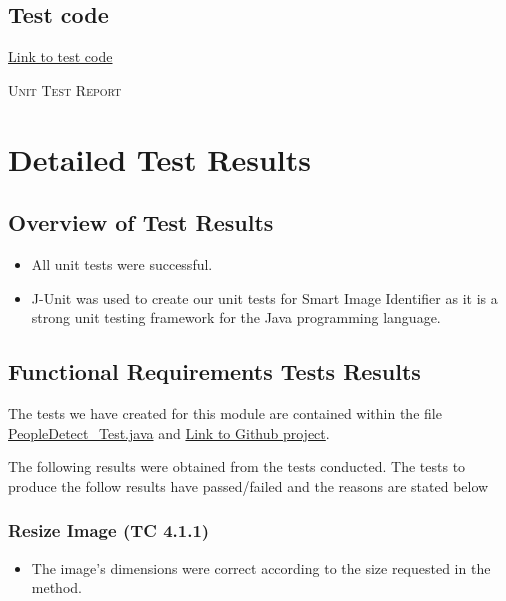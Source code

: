 \documentclass[a4paper,12pt]{report}
\begin{document}
	\subsection {Test code}
		\href{https://github.com/StephenSwanepoel/Ambitious-Designs/blob/master/Smart\%20Image\%20Identifier/src/test/com/codeferm/opencv/PeopleDetect\_Test.java}{Link to test code}  
	
\newpage
\begin{center}
	\textsc{\LARGE Unit Test Report}\\[1.5cm]
\end{center}
	\section{Detailed Test Results}
	\label{sec:Results}
	\subsection{Overview of Test Results}
	\begin {itemize}
	\item All unit tests were successful.
	\item J-Unit was used to create our unit tests for Smart Image Identifier as it is a strong unit testing framework for the Java programming language.
	\end {itemize}

	\subsection{Functional Requirements Tests Results}
		The tests we have created for this module are contained within the file \href{https://github.com/StephenSwanepoel/Ambitious-Designs/blob/master/Smart\%20Image\%20Identifier/src/test/com/codeferm/opencv/PeopleDetect\_Test.java}{PeopleDetect\_Test.java} and \href{https://github.com/StephenSwanepoel/Ambitious-Designs}{Link to Github project}.


		The following results were obtained from the tests conducted. The tests to produce the follow results have passed/failed and the reasons are stated below
		
		\subsubsection{Resize Image (TC 4.1.1)}	
			\begin {itemize}
				\item The image's dimensions were correct according to the size requested in the method.
			\end {itemize}
\end{document}
